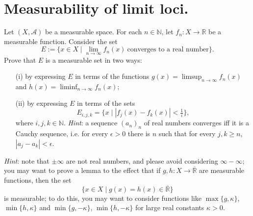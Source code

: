 \documentclass[lang=cn,11pt]{elegantbook}
\begin{document}
\section{Measurability of limit loci.}
  Let $(X, \mathcal{A})$ be a measurable space. For each $n\in \mathbb{N}$, let $f_n\colon X\to \mathbb{R}$ be a measurable function. Consider the set
  \[
    E:=\{x\in X\mid\lim_{n\to\infty} f_n(x)\ \text{converges to a real number}\}.
  \]
  Prove that $E$ is a measurable set in two ways:
  \begin{itemize}
  \item[(i)]
    by expressing $E$ in terms of the functions $g(x)=\displaystyle\limsup_{n\to \infty} f_n(x)$ and
    $h(x)= \displaystyle \liminf_{n\to \infty} f_n(x)$;
  \item[(ii)]
    by expressing $E$ in terms of the sets
    \[
      E_{i,j,k}=\{x\mid |f_j(x)-f_k(x)|<\tfrac1{i}\},
    \]
    where $i,j,k\in\mathbb{N}$.
    \textit{Hint}: a sequence $(a_n)_n$ of real numbers converges iff it is a Cauchy
    sequence, i.e. for every  $ \epsilon >0$
    there is $n$ such that for every $j,k\ge n$, $|a_j-a_k|< \epsilon$.
  \end{itemize}
  \textit{Hint}: note that $\pm\infty$ are not real numbers, and please avoid considering $\infty-\infty$; you may want to prove a lemma to the effect that if $g,h\colon X\to    \overline{\mathbb{R}}$ are measurable functions, then the set
  \[
    \{x\in X\mid g(x)=h(x)\in \overline{\mathbb{R}}    \}
  \]
  is measurable; to do this, you may want to consider functions like $\max\{g,\kappa\}$, $\min\{h,\kappa\}$ and $\min\{g,-\kappa\}$, $\min\{h,-\kappa\}$ for large real constants $\kappa>0$.
\end{document}
